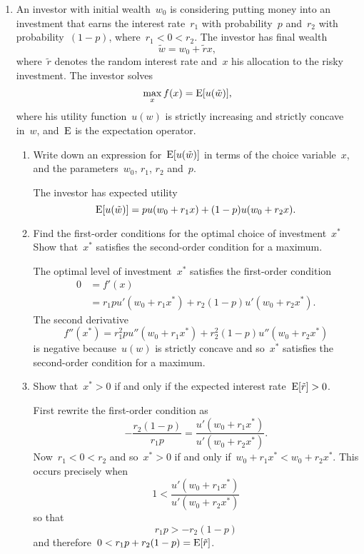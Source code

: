 
\begin{enumerate}

	\item
	An investor with initial wealth~$w_0$ is considering putting money into an investment that earns the interest rate~$r_1$ with probability~$p$ and~$r_2$ with probability~$(1-p)$, where~$r_1<0<r_2$.
	The investor has final wealth
	\[ \tilde{w}=w_0+\tilde{r}x, \]
	where~$\tilde{r}$ denotes the random interest rate and~$x$ his allocation to the risky investment.
	The investor solves
	\[ \max_xf(x)=\operatorname{E}[u(\tilde{w})], \]
	where his utility function~$u(w)$ is strictly increasing and strictly concave in~$w$, and~$\operatorname{E}$ is the expectation operator.
	\begin{enumerate}

		\item
		Write down an expression for~$\operatorname{E}[u(\tilde{w})]$ in terms of the choice variable~$x$, and the parameters~$w_0$, $r_1$, $r_2$ and~$p$.
		\begin{solution}
			The investor has expected utility
			\[ \operatorname{E}[u(\tilde{w})]=pu(w_0+r_1x)+(1-p)u(w_0+r_2x). \]
		\end{solution}

		\item
		Find the first-order conditions for the optimal choice of investment~$x^*$
		Show that~$x^*$ satisfies the second-order condition for a maximum.
		\begin{solution}
			The optimal level of investment~$x^*$ satisfies the first-order condition
			\begin{align}
				0
				&= f'(x)\\
				&= r_1pu'(w_0+r_1x^*)+r_2(1-p)u'(w_0+r_2x^*). \label{eq:investment_foc}
			\end{align}
			The second derivative
			\[ f''(x^*)=r_1^2pu''(w_0+r_1x^*)+r_2^2(1-p)u''(w_0+r_2x^*) \]
			is negative because~$u(w)$ is strictly concave and so~$x^*$ satisfies the second-order condition for a maximum.
		\end{solution}

		\item
		Show that~$x^*>0$ if and only if the expected interest rate~$\operatorname{E}[\tilde{r}]>0$.
		\begin{solution}
			First rewrite the first-order condition as
			\[ -\frac{r_2(1-p)}{r_1p}=\frac{u'(w_0+r_1x^*)}{u'(w_0+r_2x^*)}. \]
			Now~$r_1<0<r_2$ and so~$x^*>0$ if and only if~$w_0+r_1x^*<w_0+r_2x^*$.
			This occurs precisely when
			\[ 1<\frac{u'(w_0+r_1x^*)}{u'(w_0+r_2x^*)} \]
			so that
			\[ r_1p>-r_2(1-p) \]
			and therefore~$0<r_1p+r_2(1-p)=\operatorname{E}[\tilde{r}]$.
		\end{solution}


\end{enumerate}
\end{enumerate}
